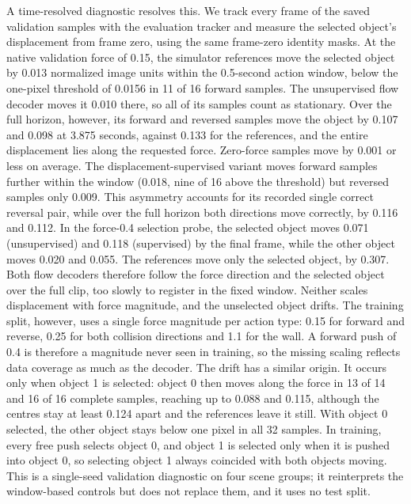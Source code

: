 \documentclass[11pt,a4paper]{article}
\begin{document}
A time-resolved diagnostic resolves this. We track every frame of the saved validation samples with the evaluation tracker and measure the selected object's displacement from frame zero, using the same frame-zero identity masks. At the native validation force of 0.15, the simulator references move the selected object by 0.013 normalized image units within the 0.5-second action window, below the one-pixel threshold of 0.0156 in 11 of 16 forward samples. The unsupervised flow decoder moves it 0.010 there, so all of its samples count as stationary. Over the full horizon, however, its forward and reversed samples move the object by 0.107 and 0.098 at 3.875 seconds, against 0.133 for the references, and the entire displacement lies along the requested force. Zero-force samples move by 0.001 or less on average. The displacement-supervised variant moves forward samples further within the window (0.018, nine of 16 above the threshold) but reversed samples only 0.009. This asymmetry accounts for its recorded single correct reversal pair, while over the full horizon both directions move correctly, by 0.116 and 0.112. In the force-0.4 selection probe, the selected object moves 0.071 (unsupervised) and 0.118 (supervised) by the final frame, while the other object moves 0.020 and 0.055. The references move only the selected object, by 0.307. Both flow decoders therefore follow the force direction and the selected object over the full clip, too slowly to register in the fixed window. Neither scales displacement with force magnitude, and the unselected object drifts. The training split, however, uses a single force magnitude per action type: 0.15 for forward and reverse, 0.25 for both collision directions and 1.1 for the wall. A forward push of 0.4 is therefore a magnitude never seen in training, so the missing scaling reflects data coverage as much as the decoder. The drift has a similar origin. It occurs only when object 1 is selected: object 0 then moves along the force in 13 of 14 and 16 of 16 complete samples, reaching up to 0.088 and 0.115, although the centres stay at least 0.124 apart and the references leave it still. With object 0 selected, the other object stays below one pixel in all 32 samples. In training, every free push selects object 0, and object 1 is selected only when it is pushed into object 0, so selecting object 1 always coincided with both objects moving. This is a single-seed validation diagnostic on four scene groups; it reinterprets the window-based controls but does not replace them, and it uses no test split.
\end{document}
